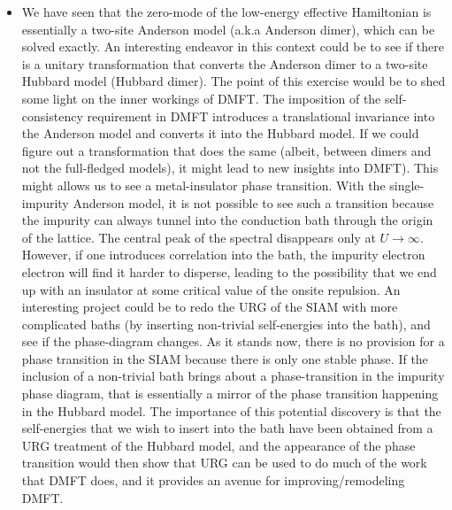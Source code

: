 \documentclass[twoside,11pt]{report}
\numberwithin{equation}{section}
\begin{document}
\begin{itemize}
	\item We have seen that the zero-mode of the low-energy effective Hamiltonian is essentially a two-site Anderson model (a.k.a Anderson dimer), which can be solved exactly. An interesting endeavor in this context could be to see if there is a unitary transformation that converts the Anderson dimer to a two-site Hubbard model (Hubbard dimer). The point of this exercise would be to shed some light on the inner workings of DMFT. The imposition of the self-consistency requirement in DMFT introduces a translational invariance into the Anderson model and converts it into the Hubbard model. If we could figure out a transformation that does the same (albeit, between dimers and not the full-fledged models), it might lead to new insights into DMFT). This might allows us to see a metal-insulator phase transition. With the single-impurity Anderson model, it is not possible to see such a transition because the impurity can always tunnel into the conduction bath through the origin of the lattice. The central peak of the spectral disappears only at \(U \to \infty\). However, if one introduces correlation into the bath, the impurity electron electron will find it harder to disperse, leading to the possibility that we end up with an insulator at some critical value of the onsite repulsion. An interesting project could be to redo the URG of the SIAM with more complicated baths (by inserting non-trivial self-energies into the bath), and see if the phase-diagram changes. As it stands now, there is no provision for a phase transition in the SIAM because there is only one stable phase. If the inclusion of a non-trivial bath brings about a phase-transition in the impurity phase diagram, that is essentially a mirror of the phase transition happening in the Hubbard model. The importance of this potential discovery is that the self-energies that we wish to insert into the bath have been obtained from a URG treatment of the Hubbard model, and the appearance of the phase transition would then show that URG can be used to do much of the work that DMFT does, and it provides an avenue for improving/remodeling DMFT.
\end{itemize}


\end{document}
